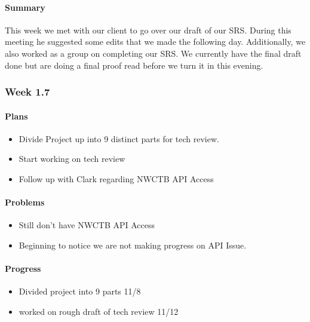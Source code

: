 \documentclass[onecolumn, draftclsnofoot,10pt, compsoc]{article}
\begin{document}
		    \paragraph{Summary} \hfill \break
		        This week we met with our client to go over our draft of our SRS. During this meeting he suggested some edits that we made the following day. Additionally, we also worked as a group on completing our SRS. We currently have the final draft done but are doing a final proof read before we turn it in this evening.\\

		\subsubsection{Week 1.7}

		    \paragraph{Plans} \hfill \break
		        \begin{itemize}
		            \item Divide Project up into 9 distinct parts for tech review.
		            \item Start working on tech review
		            \item Follow up with Clark regarding NWCTB API Access
		        \end{itemize}

		    \paragraph{Problems} \hfill \break
		        \begin{itemize}
		            \item Still don't have NWCTB API Access
		            \item Beginning to notice we are not making progress on API Issue.
		        \end{itemize}

		    \paragraph{Progress} \hfill \break
		        \begin{itemize}
		            \item Divided project into 9 parts 11/8
		            \item worked on rough draft of tech review 11/12
		        \end{itemize}
\end{document}
